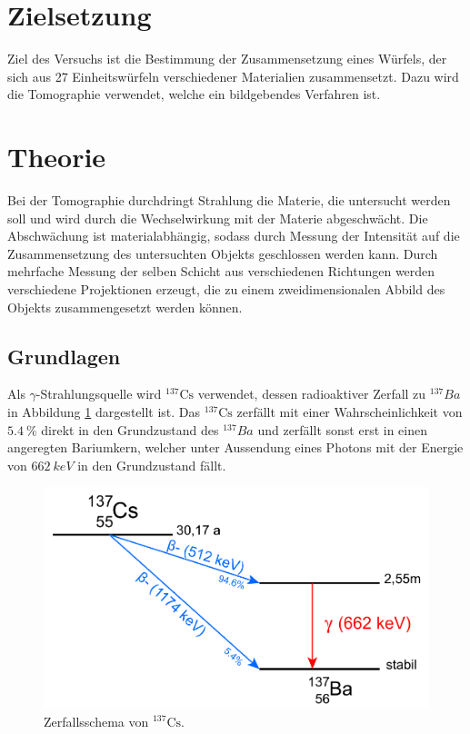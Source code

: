 \section{Zielsetzung}
Ziel des Versuchs ist die Bestimmung der Zusammensetzung eines Würfels, der sich aus 27 Einheitswürfeln verschiedener Materialien zusammensetzt.
Dazu wird die Tomographie verwendet, welche ein bildgebendes Verfahren ist.


\section{Theorie}
Bei der Tomographie durchdringt Strahlung die Materie, die untersucht werden soll und wird durch die Wechselwirkung mit der Materie abgeschwächt. Die Abschwächung ist materialabhängig, sodass durch Messung der
Intensität auf die Zusammensetzung des untersuchten Objekts geschlossen werden kann. Durch mehrfache Messung der selben Schicht aus verschiedenen Richtungen werden verschiedene Projektionen erzeugt, die zu einem
zweidimensionalen Abbild des Objekts zusammengesetzt werden können.

\subsection{Grundlagen}
Als $\gamma$-Strahlungsquelle wird ${}^{137}\text{Cs}$ verwendet, dessen radioaktiver Zerfall zu ${}^{137}Ba$ in Abbildung \ref{fig:zerfall} dargestellt ist.
Das ${}^{137}\text{Cs}$ zerfällt mit einer Wahrscheinlichkeit von $\SI{5.4}{\%}$ direkt in den Grundzustand des ${}^{137}Ba$ und zerfällt sonst erst
in einen angeregten Bariumkern, welcher unter Aussendung eines Photons mit der Energie von $\SI{662}{keV}$ in den Grundzustand fällt.

\begin{figure}
  \centering
  \includegraphics[scale=0.4]{graphics/Zerfall.png}
  \caption{Zerfallsschema von ${}^{137}\text{Cs}$\cite{zerfall}.}
  \label{fig:zerfall}
\end{figure}

